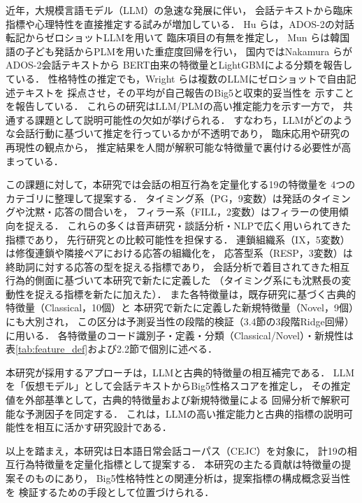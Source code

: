 \documentclass[dvipdfmx,11pt,a4paper]{bxjsarticle}
\renewcommand{\_}{\paperorigunderscore\allowbreak}%
\begin{document}
近年，大規模言語モデル（LLM）の急速な発展に伴い，
会話テキストから臨床指標や心理特性を直接推定する試みが増加している．
Hu ら\cite{hu2025}は，ADOS-2の対話転記からゼロショットLLMを用いて
臨床項目の有無を推定し，
Mun ら\cite{mun2024}は韓国語の子ども発話からPLMを用いた重症度回帰を行い，
国内ではNakamura ら\cite{nakamura2025}がADOS-2会話テキストから
BERT由来の特徴量とLightGBMによる分類を報告している．
性格特性の推定でも，Wright ら\cite{wright2026}は複数のLLMにゼロショットで自由記述テキストを
採点させ，その平均が自己報告のBig5と収束的妥当性を
示すことを報告している．
これらの研究はLLM/PLMの高い推定能力を示す一方で，
共通する課題として説明可能性の欠如が挙げられる．
すなわち，LLMがどのような会話行動に基づいて推定を行っているかが不透明であり，
臨床応用や研究の再現性の観点から，
推定結果を人間が解釈可能な特徴量で裏付ける必要性が高まっている．

この課題に対して，本研究では会話の相互行為を定量化する19の特徴量を
4つのカテゴリに整理して提案する．
タイミング系（PG，9変数）は発話のタイミングや沈黙・応答の間合いを，
フィラー系（FILL，2変数）はフィラーの使用傾向を捉える．
これらの多くは音声研究・談話分析・NLPで広く用いられてきた指標であり\cite{levitan2012,deruiter2006,clark1996,watanabe2003}，
先行研究との比較可能性を担保する．
連鎖組織系（IX，5変数）は修復連鎖や隣接ペアにおける応答の組織化を，
応答型系（RESP，3変数）は終助詞に対する応答の型を捉える指標であり，
会話分析で着目されてきた相互行為的側面に基づいて本研究で新たに定義した
（タイミング系にも沈黙長の変動性を捉える指標を新たに加えた）．
また各特徴量は，既存研究に基づく古典的特徴量（Classical，10個）と
本研究で新たに定義した新規特徴量（Novel，9個）にも大別され，
この区分は予測妥当性の段階的検証（3.4節の3段階Ridge回帰）に用いる．
各特徴量のコード識別子・定義・分類（Classical/Novel）・新規性は
表\ref{tab:feature_def}および2.2節で個別に述べる．

本研究が採用するアプローチは，LLMと古典的特徴量の相互補完である．
LLMを「仮想モデル」として会話テキストからBig5性格スコアを推定し，
その推定値を外部基準として，古典的特徴量および新規特徴量による
回帰分析で解釈可能な予測因子を同定する．
これは，LLMの高い推定能力と古典的指標の説明可能性を相互に活かす研究設計である．

以上を踏まえ，本研究は日本語日常会話コーパス（CEJC）を対象に，
計19の相互行為特徴量を定量化指標として提案する．
本研究の主たる貢献は特徴量の提案そのものにあり，
Big5性格特性との関連分析は，提案指標の構成概念妥当性を
検証するための手段として位置づけられる．
\end{document}
